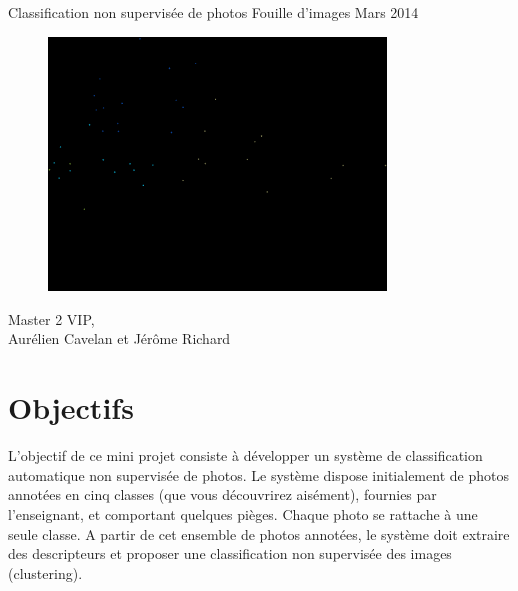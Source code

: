 \documentclass[12pt,a4paper,utf8x]{report}
\begin{document}
\begin{titlepage}
\hfill
  \begin{center}
    \begin{minipage}[t]{12cm} 
    \huge \center Classification non supervisée de photos
    \huge \center Fouille d'images
    \huge \center Mars 2014
    \end{minipage}
  \end{center}
\vfill
\begin{figure}[!h]
      \centering            
      \includegraphics[width=0.8\textwidth]{ACP_SIFT.png} 
    \end{figure}
\begin{flushleft}
\begin{minipage}[t]{5cm}
Master 2 VIP, \\ Aurélien Cavelan et Jérôme Richard
\end{minipage}
\end{flushleft}

\end{titlepage}
\tableofcontents

\chapter{Objectifs}

L'objectif de ce mini projet consiste à développer un système de classification automatique non supervisée de photos. Le système dispose initialement de photos annotées en cinq classes (que vous découvrirez aisément), fournies par l'enseignant, et comportant quelques pièges. Chaque photo se rattache à une seule classe. A partir de cet ensemble de photos annotées, le système doit extraire des descripteurs et proposer une classification non supervisée des images (clustering).
\end{document}
